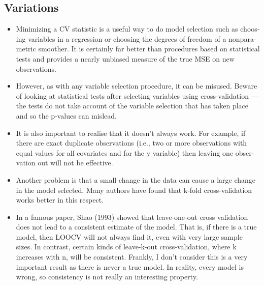 \documentclass[a4paper,12pt]{article}
\begin{document}
\subsection{Variations}

\begin{itemize}
	\item Min­i­miz­ing a CV sta­tis­tic is a use­ful way to do model selec­tion such as choos­ing vari­ables in a regres­sion or choos­ing the degrees of free­dom of a non­para­met­ric smoother. It is cer­tainly far bet­ter than pro­ce­dures based on sta­tis­ti­cal tests and pro­vides a nearly unbi­ased mea­sure of the true MSE on new observations.
	
\item How­ever, as with any vari­able selec­tion pro­ce­dure, it can be mis­used. Beware of look­ing at sta­tis­ti­cal tests after select­ing vari­ables using cross-​​validation — the tests do not take account of the vari­able selec­tion that has taken place and so the p-​​values can mislead.
	
\item It is also impor­tant to realise that it doesn’t always work. For exam­ple, if there are exact dupli­cate obser­va­tions (i.e., two or more obser­va­tions with equal val­ues for all covari­ates and for the y vari­able) then leav­ing one obser­va­tion out will not be effective.
	
\item Another prob­lem is that a small change in the data can cause a large change in the model selected. Many authors have found that k-​​fold cross-​​validation works bet­ter in this respect.
\item In a famous paper, Shao (1993) showed that leave-​​one-​​out cross val­i­da­tion does not lead to a con­sis­tent esti­mate of the model. That is, if there is a true model, then LOOCV will not always find it, even with very large sam­ple sizes. In con­trast, cer­tain kinds of leave-​​k-​​out cross-​​validation, where k increases with n, will be con­sis­tent. Frankly, I don’t con­sider this is a very impor­tant result as there is never a true model. In real­ity, every model is wrong, so con­sis­tency is not really an inter­est­ing property.
\end{itemize}
\end{document}
